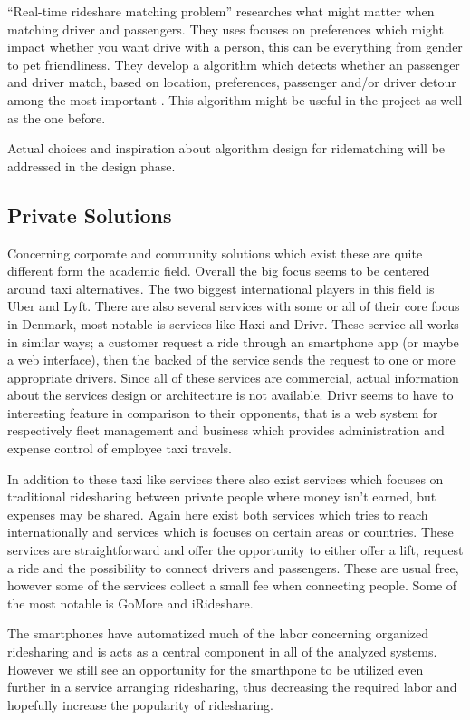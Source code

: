 ``Real-time rideshare matching problem'' researches what might matter when matching driver and passengers.
They uses focuses on preferences which might impact whether you want drive with a person, this can be everything from gender to pet friendliness.
They develop a algorithm which detects whether an passenger and driver match, based on location, preferences, passenger and/or driver detour among the most important \cite{ghoseiri2011real}.
This algorithm might be useful in the project as well as the one before.

Actual choices and inspiration about algorithm design for ridematching will be addressed in the design phase. 

\subsection{Private Solutions}
Concerning corporate and community solutions which exist these are quite different form the academic field.
Overall the big focus seems to be centered around taxi alternatives.
The two biggest international players in this field is Uber and Lyft.
There are also several services with some or all of their core focus in Denmark, most notable is services like Haxi and Drivr.
These service all works in similar ways; a customer request a ride through an smartphone app (or maybe a web interface), then the backed of the service sends the request to one or more appropriate drivers.
Since all of these services are commercial, actual information about the services design or architecture is not available.
Drivr seems to have to interesting feature in comparison to their opponents, that is a web system for respectively fleet management and business which provides administration and expense control of employee taxi travels.

In addition to these taxi like services there also exist services which focuses on traditional ridesharing between private people where money isn't earned, but expenses may be shared.
Again here exist both services which tries to reach internationally and services which is focuses on certain areas or countries.
These services are straightforward and offer the opportunity to either offer a lift, request a ride and the possibility to connect drivers and passengers.
These are usual free, however some of the services collect a small fee when connecting people.
Some of the most notable is GoMore and iRideshare.

The smartphones have automatized much of the labor concerning organized ridesharing and is acts as a central component in all of the analyzed systems.
However we still see an opportunity for the smarthpone to be utilized even further in a service arranging ridesharing, thus decreasing the required labor and hopefully increase the popularity of ridesharing.